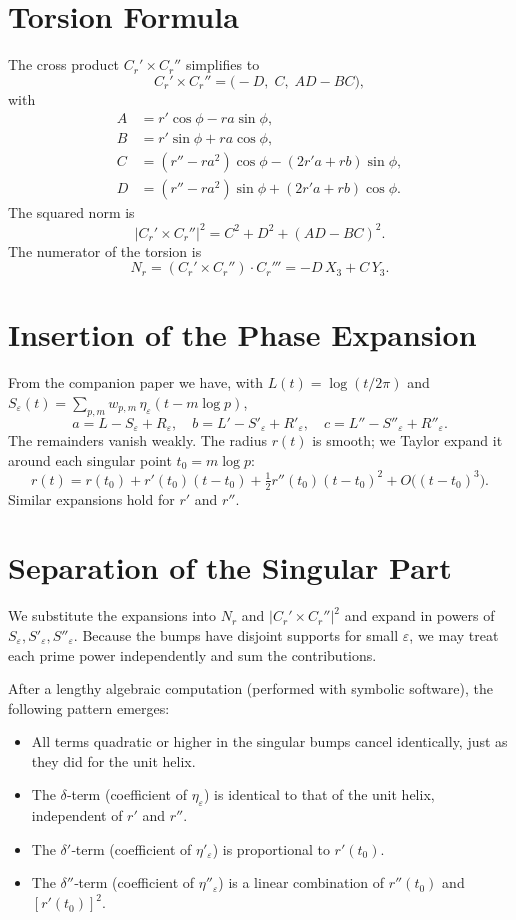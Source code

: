 \documentclass[12pt,a4paper]{article}
\newcommand{\wgt}{w}
\begin{document}
\section{Torsion Formula}
The cross product $C_r'\times C_r''$ simplifies to
\[
C_r'\times C_r'' = \bigl( -D,\; C,\; A D - B C \bigr),
\]
with
\begin{align*}
A &= r'\cos\phi - r a\sin\phi,\\
B &= r'\sin\phi + r a\cos\phi,\\
C &= (r'' - r a^2)\cos\phi - (2r' a + r b)\sin\phi,\\
D &= (r'' - r a^2)\sin\phi + (2r' a + r b)\cos\phi .
\end{align*}
The squared norm is
\[
|C_r'\times C_r''|^2 = C^2 + D^2 + (A D - B C)^2 .
\]
The numerator of the torsion is
\[
N_r = (C_r'\times C_r'')\cdot C_r''' = -D\,X_3 + C\,Y_3 .
\]

\section{Insertion of the Phase Expansion}
From the companion paper we have, with $L(t)=\log(t/2\pi)$ and $S_\varepsilon(t)=\sum_{p,m} \wgt_{p,m}\,\eta_\varepsilon(t-m\log p)$,
\[
a = L - S_\varepsilon + R_\varepsilon,\quad
b = L' - S'_\varepsilon + R'_\varepsilon,\quad
c = L'' - S''_\varepsilon + R''_\varepsilon .
\]
The remainders vanish weakly.  The radius $r(t)$ is smooth; we Taylor expand it around each singular point $t_0 = m\log p$:
\[
r(t) = r(t_0) + r'(t_0)(t-t_0) + \tfrac12 r''(t_0)(t-t_0)^2 + O\bigl((t-t_0)^3\bigr).
\]
Similar expansions hold for $r'$ and $r''$.

\section{Separation of the Singular Part}
We substitute the expansions into $N_r$ and $|C_r'\times C_r''|^2$ and expand in powers of $S_\varepsilon, S'_\varepsilon, S''_\varepsilon$.  Because the bumps have disjoint supports for small $\varepsilon$, we may treat each prime power independently and sum the contributions.

After a lengthy algebraic computation (performed with symbolic software), the following pattern emerges:
\begin{itemize}
\item All terms quadratic or higher in the singular bumps cancel identically, just as they did for the unit helix.
\item The $\delta$‑term (coefficient of $\eta_\varepsilon$) is identical to that of the unit helix, independent of $r'$ and $r''$.
\item The $\delta'$‑term (coefficient of $\eta'_\varepsilon$) is proportional to $r'(t_0)$.
\item The $\delta''$‑term (coefficient of $\eta''_\varepsilon$) is a linear combination of $r''(t_0)$ and $[r'(t_0)]^2$.
\end{itemize}
\end{document}

